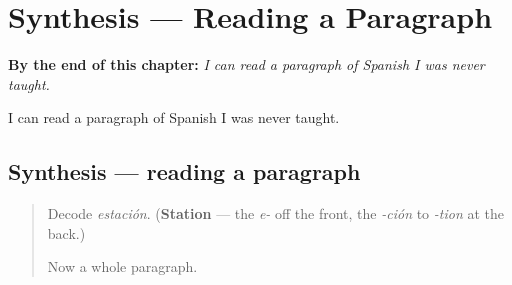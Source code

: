 
\chapter{Synthesis --- Reading a Paragraph}
\label{ch:sintesis-ocho}

\begin{chapteropening}
\textbf{By the end of this chapter:} \emph{I can read a paragraph of Spanish I was never taught.}

I can read a paragraph of Spanish I was never taught.
\end{chapteropening}

\section[Practice]{Synthesis — reading a paragraph}

\label{lesson:ES-C09-sintesis-ocho}



\begin{quote}
Decode \emph{estación}. (\textbf{Station} — the \emph{e-} off the front, the \emph{-ción} to \emph{-tion} at the back.)

Now a whole paragraph.
\end{quote}

